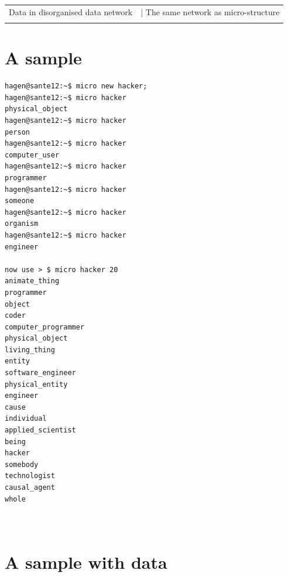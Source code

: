 \documentclass[15pt]{article}
\begin{document}
    \begin{tabular}{cc}
    Data in disorganised data network           &|    The same network as micro-structure\\
    \\

    \end{tabular}

\section{A sample}

  \begin{verbatim}
hagen@sante12:~$ micro new hacker;
hagen@sante12:~$ micro hacker
physical_object
hagen@sante12:~$ micro hacker
person
hagen@sante12:~$ micro hacker
computer_user
hagen@sante12:~$ micro hacker
programmer
hagen@sante12:~$ micro hacker
someone
hagen@sante12:~$ micro hacker
organism
hagen@sante12:~$ micro hacker
engineer

now use > $ micro hacker 20
animate_thing
programmer
object
coder
computer_programmer
physical_object
living_thing
entity
software_engineer
physical_entity
engineer
cause
individual
applied_scientist
being
hacker
somebody
technologist
causal_agent
whole



  \end{verbatim}


\vskip 1cm


\section{A sample with data}
\end{document}
